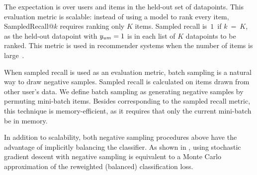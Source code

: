 The expectation is over users and items in the held-out set of datapoints. This evaluation metric is scalable: instead of using a model to rank every item, SampledRecall@$k$ requires ranking only $K$ items. Sampled recall is~$1$~if $k~=~K$, as the held-out datapoint with $y_{um} = 1$ is in each list of $K$ datapoints to be ranked. This metric is used in recommender systems when the number of items is large~\citep{ebesu2018collaborative,yang2018openrec:}.

When sampled recall is used as an evaluation metric, batch sampling is a natural way to draw negative samples. Sampled recall is calculated on items drawn from other user's data. We define batch sampling as generating negative samples by permuting mini-batch items. Besides corresponding to the sampled recall metric, this technique is memory-efficient, as it requires that only the current mini-batch be in memory.

In addition to scalability, both negative sampling procedures above have
the advantage of implicitly balancing the classifier. As shown in
\citet{veitch2019empirical}, using stochastic gradient descent with
negative sampling is equivalent to a Monte Carlo approximation of the
reweighted (balanced) classification loss.
